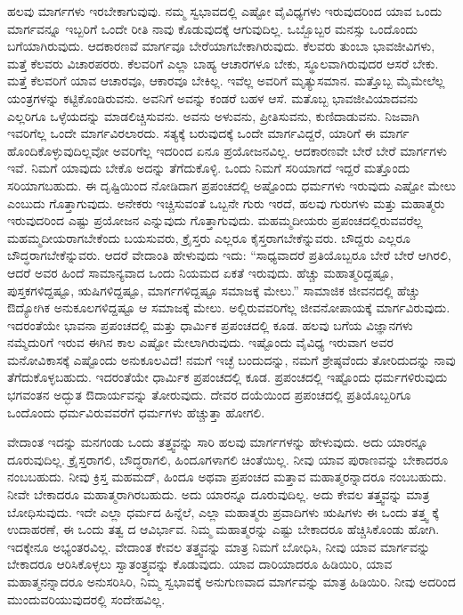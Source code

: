 ಹಲವು ಮಾರ್ಗಗಳು ಇರಬೇಕಾಗುವುವು. ನಮ್ಮ ಸ್ವಭಾವದಲ್ಲಿ ಎಷ್ಟೋ ವೈವಿಧ್ಯಗಳು ಇರುವುದರಿಂದ ಯಾವ ಒಂದು ಮಾರ್ಗವನ್ನೂ ಇಬ್ಬರಿಗೆ ಒಂದೇ ರೀತಿ ನಾವು ಕೊಡುವುದಕ್ಕೆ ಆಗುವುದಿಲ್ಲ. ಒಬ್ಬೊಬ್ಬರ ಮನಸ್ಸು ಒಂದೊಂದು ಬಗೆಯಾಗಿರುವುದು. ಆದಕಾರಣವೆ ಮಾರ್ಗವೂ ಬೇರೆಯಾಗಬೇಕಾಗಿರುವುದು. ಕೆಲವರು ತುಂಬಾ ಭಾವಜೀವಿಗಳು, ಮತ್ತೆ ಕೆಲವರು ವಿಚಾರಪರರು. ಕೆಲವರಿಗೆ ಎಲ್ಲಾ ಬಾಹ್ಯ ಆಚಾರಗಳೂ ಬೇಕು, ಸ್ಥೂಲವಾಗಿರುವುದರ ಆಸರೆ ಬೇಕು. ಮತ್ತೆ ಕೆಲವರಿಗೆ ಯಾವ ಆಚಾರವೂ, ಆಕಾರವೂ ಬೇಕಿಲ್ಲ. ಇವೆಲ್ಲ ಅವರಿಗೆ ಮೃತ್ಯುಸಮಾನ. ಮತ್ತೊಬ್ಬ ಮೈಮೇಲೆಲ್ಲ ಯಂತ್ರಗಳನ್ನು ಕಟ್ಟಿಕೊಂಡಿರುವನು. ಅವನಿಗೆ ಅವನ್ನು ಕಂಡರೆ ಬಹಳ ಆಸೆ. ಮತೊಬ್ಬ ಭಾವಜೀವಿಯಾದವನು ಎಲ್ಲರಿಗೂ ಒಳ್ಳೆಯದನ್ನು ಮಾಡಲಿಚ್ಚಿಸುವನು. ಅವನು ಅಳುವನು, ಪ್ರೀತಿಸುವನು, ಕುಣಿದಾಡುವನು. ನಿಜವಾಗಿ ಇವರಿಗೆಲ್ಲ ಒಂದೇ ಮಾರ್ಗವಿರಲಾರದು. ಸತ್ಯಕ್ಕೆ ಬರುವುದಕ್ಕೆ ಒಂದೇ ಮಾರ್ಗವಿದ್ದರೆ, ಯಾರಿಗೆ ಈ ಮಾರ್ಗ ಹೊಂದಿಕೊಳ್ಳುವುದಿಲ್ಲವೋ ಅವರಿಗೆಲ್ಲ ಇದರಿಂದ ಏನೂ ಪ್ರಯೋಜನವಿಲ್ಲ. ಆದಕಾರಣವೇ ಬೇರೆ ಬೇರೆ ಮಾರ್ಗಗಳು ಇವೆ. ನಿಮಗೆ ಯಾವುದು ಬೇಕೊ ಅದನ್ನು ತೆಗೆದುಕೊಳ್ಳಿ. ಒಂದು ನಿಮಗೆ ಸರಿಯಾಗದೆ ಇದ್ದರೆ ಮತ್ತೊಂದು ಸರಿಯಾಗಬಹುದು. ಈ ದೃಷ್ಟಿಯಿಂದ ನೋಡಿದಾಗ ಪ್ರಪಂಚದಲ್ಲಿ ಅಷ್ಟೊಂದು ಧರ್ಮಗಳು ಇರುವುದು ಎಷ್ಟೋ ಮೇಲು ಎಂಬುದು ಗೊತ್ತಾಗುವುದು. ಅನೇಕರು ಇಚ್ಚಿಸುವಂತೆ ಒಬ್ಬನೇ ಗುರು ಇರದೆ, ಹಲವು ಗುರುಗಳು ಮತ್ತು ಮಹಾತ್ಮರು ಇರುವುದರಿಂದ ಎಷ್ಟು ಪ್ರಯೋಜನ ಎನ್ನುವುದು ಗೊತ್ತಾಗುವುದು. ಮಹಮ್ಮದೀಯರು ಪ್ರಪಂಚದಲ್ಲಿರುವವರೆಲ್ಲ ಮಹಮ್ಮದೀಯರಾಗಬೇಕೆಂದು ಬಯಸುವರು, ಕ್ರೈಸ್ತರು ಎಲ್ಲರೂ ಕೈಸ್ತರಾಗಬೇಕೆನ್ನುವರು. ಬೌದ್ದರು ಎಲ್ಲರೂ ಬೌದ್ಧರಾಗಬೇಕೆನ್ನುವರು. ಆದರೆ ವೇದಾಂತಿ ಹೇಳುವುದು ಇದು: “ಸಾಧ್ಯವಾದರೆ ಪ್ರತಿಯೊಬ್ಬರೂ ಬೇರೆ ಬೇರೆ ಆಗಿರಲಿ, ಆದರೆ ಅವರ ಹಿಂದೆ ಸಾಮಾನ್ಯವಾದ ಒಂದು ನಿಯಮದ ಏಕತೆ ಇರುವುದು. ಹೆಚ್ಚು ಮಹಾತ್ಮರಿದ್ದಷ್ಟೂ, ಪುಸ್ತಕಗಳಿದ್ದಷ್ಟೂ, ಋಷಿಗಳಿದ್ದಷ್ಟೂ, ಮಾರ್ಗಗಳಿದ್ದಷ್ಟೂ ಸಮಾಜಕ್ಕೆ ಮೇಲು.” ಸಾಮಾಜಿಕ ಜೀವನದಲ್ಲಿ ಹೆಚ್ಚು ಔದ್ಯೋಗಿಕ ಅನುಕೂಲಗಳಿದ್ದಷ್ಟೂ ಆ ಸಮಾಜಕ್ಕೆ ಮೇಲು. ಅಲ್ಲಿರುವವರಿಗೆಲ್ಲ ಜೀವನೋಪಾಯಕ್ಕೆ ಮಾರ್ಗವಿರುವುದು. ಇದರಂತೆಯೇ ಭಾವನಾ ಪ್ರಪಂಚದಲ್ಲಿ ಮತ್ತು ಧಾರ್ಮಿಕ ಪ್ರಪಂಚದಲ್ಲಿ ಕೂಡ. ಹಲವು ಬಗೆಯ ವಿಜ್ಞಾನಗಳು ನಮ್ಮೆದುರಿಗೆ ಇರುವ ಈಗಿನ ಕಾಲ ಎಷ್ಟೋ ಮೇಲಾಗಿರುವುದು. ಇಷ್ಟೊಂದು ವೈವಿಧ್ಯ ಇರುವಾಗ ಅವರ ಮನೋವಿಕಾಸಕ್ಕೆ ಎಷ್ಟೊಂದು ಅನುಕೂಲವಿದೆ! ನಮಗೆ ಇಚ್ಛೆ ಬಂದುದನ್ನು, ನಮಗೆ ಶ್ರೇಷ್ಠವೆಂದು ತೋರಿದುದನ್ನು ನಾವು ತೆಗೆದುಕೊಳ್ಳಬಹುದು. ಇದರಂತೆಯೇ ಧಾರ್ಮಿಕ ಪ್ರಪಂಚದಲ್ಲಿ ಕೂಡ. ಪ್ರಪಂಚದಲ್ಲಿ ಇಷ್ಟೊಂದು ಧರ್ಮಗಳಿರುವುದು ಭಗವಂತನ ಅದ್ಭುತ ಔದಾರ್ಯವನ್ನು ತೋರುವುದು. ದೇವರ ದಯೆಯಿಂದ ಪ್ರಪಂಚದಲ್ಲಿ ಪ್ರತಿಯೊಬ್ಬರಿಗೂ ಒಂದೊಂದು ಧರ್ಮವಿರುವವರೆಗೆ ಧರ್ಮಗಳು ಹೆಚ್ಚುತ್ತಾ ಹೋಗಲಿ.

ವೇದಾಂತ ಇದನ್ನು ಮನಗಂಡು ಒಂದು ತತ್ತ್ವವನ್ನು ಸಾರಿ ಹಲವು ಮಾರ್ಗಗಳನ್ನು ಹೇಳುವುದು. ಅದು ಯಾರನ್ನೂ ದೂರುವುದಿಲ್ಲ. ಕ್ರೈಸ್ತರಾಗಲಿ, ಬೌದ್ಧರಾಗಲಿ, ಹಿಂದೂಗಳಾಗಲಿ ಚಿಂತೆಯಿಲ್ಲ. ನೀವು ಯಾವ ಪುರಾಣವನ್ನು ಬೇಕಾದರೂ ನಂಬಬಹುದು. ನೀವು ಕ್ರಿಸ್ತ ಮಹಮದ್, ಹಿಂದೂ ಅಥವಾ ಪ್ರಪಂಚದ ಮತ್ತಾವ ಮಹಾತ್ಮರನ್ನಾದರೂ ನಂಬಬಹುದು. ನೀವೇ ಬೇಕಾದರೂ ಮಹಾತ್ಮರಾಗಿರಬಹುದು. ಅದು ಯಾರನ್ನೂ ದೂರುವುದಿಲ್ಲ. ಅದು ಕೇವಲ ತತ್ತ್ವವನ್ನು ಮಾತ್ರ ಬೋಧಿಸುವುದು. ಇದೇ ಎಲ್ಲಾ ಧರ್ಮದ ಹಿನ್ನೆಲೆ, ಎಲ್ಲಾ ಮಹಾತ್ಮರು ಪ್ರವಾದಿಗಳು ಋಷಿಗಳು ಈ ಒಂದು ತತ್ತ್ವ ಕ್ಕೆ ಉದಾಹರಣೆ, ಈ ಒಂದು ತತ್ವ ದ ಆವಿರ್ಭಾವ. ನಿಮ್ಮ ಮಹಾತ್ಮರನ್ನು ಎಷ್ಟು ಬೇಕಾದರೂ ಹೆಚ್ಚಿಸಿಕೊಂಡು ಹೋಗಿ. ಇದಕ್ಕೇನೂ ಅಭ್ಯಂತರವಿಲ್ಲ. ವೇದಾಂತ ಕೇವಲ ತತ್ತ್ವವನ್ನು ಮಾತ್ರ ನಿಮಗೆ ಬೋಧಿಸಿ, ನೀವು ಯಾವ ಮಾರ್ಗವನ್ನು ಬೇಕಾದರೂ ಆರಿಸಿಕೊಳ್ಳಲು ಸ್ವಾತಂತ್ರ್ಯವನ್ನು ಕೊಡುವುದು. ಯಾವ ದಾರಿಯಾದರೂ ಹಿಡಿಯಿರಿ, ಯಾವ ಮಹಾತ್ಮನನ್ನಾದರೂ ಅನುಸರಿಸಿರಿ, ನಿಮ್ಮ ಸ್ವಭಾವಕ್ಕೆ ಅನುಗುಣವಾದ ಮಾರ್ಗವನ್ನು ಮಾತ್ರ ಹಿಡಿಯಿರಿ. ನೀವು ಅದರಿಂದ ಮುಂದುವರಿಯುವುದರಲ್ಲಿ ಸಂದೇಹವಿಲ್ಲ.

